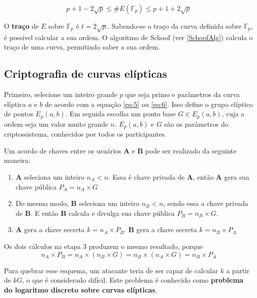 \begin{equation}
p + 1 - 2\sqrt{p} \leq \#E(\mathbb{F}_p) \leq p + 1 + 2\sqrt{p}
\label{eq:HasseBounds}
\end{equation}

O \textbf{traço} de $E$ sobre $\mathbb{F}_p$ é $t = 2\sqrt{p}$. Sabendo-se o traço da curva definida sobre $\mathbb{F}_p$, é possível calcular a sua ordem. O algoritmo de Schoof (ver \ref{SchoofAlg}) calcula o traço de uma curva, permitindo saber a sua ordem.

%
%
\subsection{Criptografia de curvas elípticas} \label{sec:ecc}
Primeiro, selecione um inteiro grande \(p\) que seja primo e parâmetros da curva elíptica \(a\) e \(b\) de acordo com a equação \ref{eq:5} ou \ref{eq:6}. Isso define o grupo elíptico de pontos $E_p(a, b)$. Em seguida escolha um ponto base $G \in E_p(a, b)$, cuja a ordem seja um valor muito grande \(n\). $E_p(a, b)$ e \(G\) são os parâmetros do criptossistema, conhecidos por todos os participantes.

Um acordo de chaves entre os usuários \textbf{A} e \textbf{B} pode ser realizado da seguinte maneira:
\begin{enumerate}
\item \textbf{A} seleciona um inteiro \(n_A < n\). Essa é chave privada de \textbf{A}, então \textbf{A} gera sua chave pública $P_A = n_A \times G$
\item Do mesmo modo, \textbf{B} seleciona um inteiro \(n_B < n\), sendo essa a chave privada de \textbf{B}. E então \textbf{B} calcula e divulga sua chave pública $P_B = n_B \times G$.
\item \textbf{A} gera a chave secreta $k = n_A \times P_B$. \textbf{B} gera a chave secreta $k = n_B \times P_A$
\end{enumerate}

Os dois cálculos na etapa 3 produzem o mesmo resultado, porque
\begin{equation*}
n_A \times P_B = n_A \times (n_B \times G) = n_B \times (n_A \times G) = n_B \times P_A
\end{equation*}

Para quebrar esse esquema, um atacante teria de ser capaz de calcular \(k\) a partir de \(kG\), o que é considerado difícil. Este problema é conhecido como \textbf{problema do logaritmo discreto sobre curvas elípticas}.
